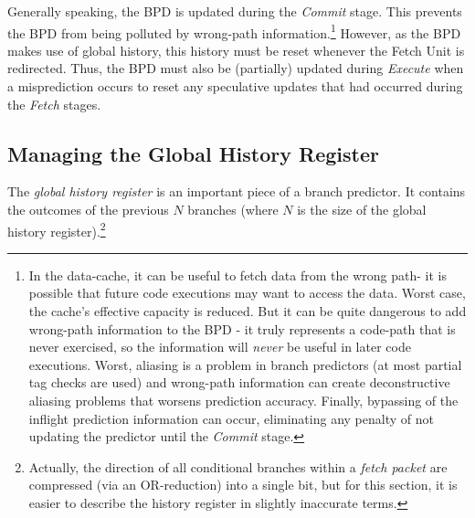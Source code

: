 Generally speaking, the BPD is updated during the {\em Commit} stage. This prevents the BPD from being polluted by wrong-path information.\footnote{In the data-cache, it can be useful to fetch data from the wrong path- it is possible that future code executions may want to access the data. Worst case, the cache's effective capacity is reduced. But it can be quite dangerous to add wrong-path information to the BPD - it truly represents a code-path that is never exercised, so the information will {\em never} be useful in later code executions. Worst, aliasing is a problem in branch predictors (at most partial tag checks are used) and wrong-path information can create deconstructive aliasing problems that worsens prediction accuracy.  Finally, bypassing of the inflight prediction information can occur, eliminating any penalty of not updating the predictor until the {\em Commit} stage.}  
However, as the BPD makes use of global history, this history must be reset whenever the Fetch Unit is redirected. Thus, the BPD must also be (partially) updated during {\em Execute} when a misprediction occurs to reset any speculative updates that had occurred during the {\em Fetch} stages.




\subsection{Managing the Global History Register}

The {\em global history register} is an important piece of a branch predictor. It contains the outcomes of the previous $N$ branches (where $N$ is the size of the global history register).\footnote{Actually, the direction of all conditional branches within a {\em fetch packet} are compressed (via an OR-reduction) into a single bit, but for this section, it is easier to describe the history register in slightly inaccurate terms.}

